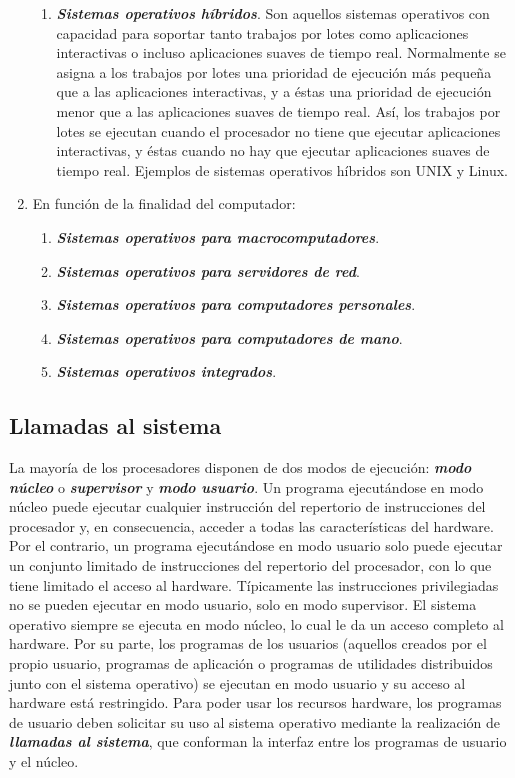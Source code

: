 \documentclass[12pt]{article}
\begin{document}
\begin{enumerate}
\begin{enumerate}
\item \textbf{\textit{Sistemas operativos híbridos}}. Son aquellos sistemas operativos con capacidad para soportar tanto
trabajos por lotes como aplicaciones interactivas o incluso aplicaciones suaves de tiempo real. Normalmente se asigna a los trabajos por lotes una prioridad de ejecución más pequeña que a las
aplicaciones interactivas, y a éstas una prioridad de ejecución menor que a las aplicaciones suaves de tiempo real. Así, los trabajos por lotes se ejecutan cuando el procesador no tiene que ejecutar aplicaciones interactivas, y éstas cuando no hay que ejecutar aplicaciones suaves de tiempo real. Ejemplos de sistemas operativos híbridos son UNIX y Linux.
\end{enumerate}
\item En función de la finalidad del computador:
\begin{enumerate}
\item \textbf{\textit{Sistemas operativos para macrocomputadores}}.
\item \textbf{\textit{Sistemas operativos para servidores de red}}.
\item \textbf{\textit{Sistemas operativos para computadores personales}}.
\item \textbf{\textit{Sistemas operativos para computadores de mano}}.
\item \textbf{\textit{Sistemas operativos integrados}}.
\end{enumerate}
\end{enumerate}

\subsection{Llamadas al sistema}

La mayoría de los procesadores disponen de dos modos de ejecución: \textbf{\textit{modo núcleo}} o \textbf{\textit{supervisor}} y \textbf{\textit{modo usuario}}. Un programa ejecutándose en modo núcleo puede ejecutar cualquier instrucción del repertorio de instrucciones del procesador y, en consecuencia, acceder a todas las características del hardware. Por el contrario, un programa ejecutándose en modo usuario solo puede ejecutar un conjunto limitado de instrucciones del repertorio del procesador, con lo que tiene limitado el acceso al hardware. Típicamente las instrucciones privilegiadas no se pueden ejecutar en modo usuario, solo en modo supervisor. El sistema operativo siempre se ejecuta en modo núcleo, lo cual le da un acceso completo al hardware. Por su parte, los programas de los usuarios (aquellos creados por el propio usuario, programas de aplicación o programas de utilidades distribuidos junto con el sistema operativo) se ejecutan en modo usuario y su acceso al hardware está restringido. Para poder usar los recursos hardware, los programas de usuario deben solicitar su uso al sistema operativo mediante la realización de \textbf{\textit{llamadas al sistema}}, que conforman la interfaz entre los programas de usuario y el núcleo.
\end{document}
